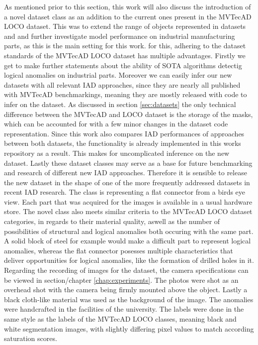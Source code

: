As mentioned prior to this section, this work will also discuss the introduction of a novel dataset class as an addition to the current ones present in the MVTecAD LOCO dataset.
This was to extend the range of objects represented in datasets \cite{MVTEC_Bergmann_2021} and \cite{LOCODentsAndScratchesBergmann2022} and further investigate model performance on industrial manufacturing parts, as this is the 
main setting for this work. for this, adhering to the dataset standards of the MVTecAD LOCO dataset has multiple advantages. Firstly we get to make further statements about the ability of SOTA algorithms detectig 
logical anomalies on industrial parts. Moreover we can easily infer our new datasets with all relevant IAD approaches, since they are nearly all published with MVTecAD benchmarkings, meaning 
they are mostly released with code to infer on the dataset. As discussed in section \ref{sec:datasets} the only technical difference between the MVTecAD and LOCO dataset is the storage of the masks, 
which can be accounted for with a few minor changes in the dataset code representation. Since this work also compares IAD performances of approaches between both datasets, the functionality 
is already implemented in this works repository as a result. This makes for uncomplicated inference on the new dataset. Lastly these dataset classes may serve as a base for future benchmarking 
and research of different new IAD approaches. Therefore it is sensible to release the new dataset in the shape of one of the more frequently addressed datasets in recent IAD research. 
The class is representing a flat connector from a birds eye view. Each part that was acquired for the images is available in a 
usual hardware store. The novel class also 
meets similar criteria to the MVTecAD LOCO dataset categories, in regards to their material quality, aswell as the number of possibilities of structural and logical anomalies both occuring with the same part. A solid block of steel for example 
would make a difficult part to represent logical anomalies, whereas the flat connector posesses multiple characteristics that deliver opportunities for logical anomalies, like the formation of drilled holes in it.
Regarding the recording of images for the dataset, the camera specifications can be viewed in section/chapter \ref{chap:experiments}. The photos were shot as an overhead shot with the camera being firmly 
mounted above the object. Lastly a black cloth-like material was used 
as the background of the image. The anomalies were handcrafted in the facilities of the university. The labels 
were done in the same style as the labels of the MVTecAD LOCO classes, meaning black and white segmentation images, with slightly differing pixel values to match according saturation scores. 

